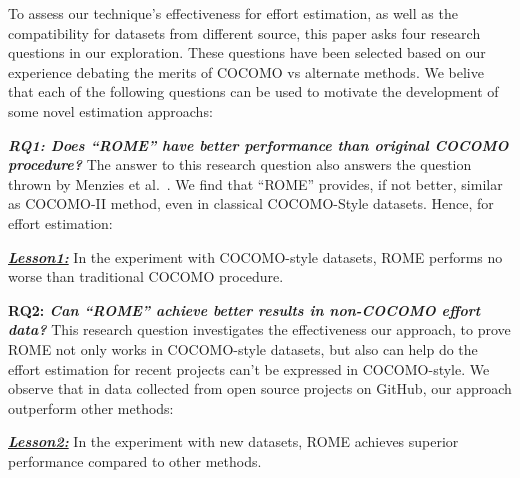 \documentclass[sigconf,review]{acmart}
\newenvironment{result}[2]
{\begin{myshadowbox}\textbf{\textit{\underline{Lesson#1:}}} #2}{ 
\end{myshadowbox}}
\begin{document}

To assess our technique's effectiveness for effort estimation, as well as the compatibility for datasets from different source, this paper asks four research questions in our exploration. These questions have been selected based on our experience debating the merits of COCOMO vs alternate methods. We belive that each of the following questions can be used to motivate the development of some  novel estimation approachs:


{\bf \em RQ1: Does ``ROME'' have better performance than original COCOMO procedure?} The answer to this research question also answers the question thrown by Menzies et al.~\cite{MenziesNeg:2017}. 
We find that ``ROME'' provides, if not better, similar as COCOMO-II method, even in classical COCOMO-Style datasets. Hence, for effort estimation:
 \begin{result}{1}
 In the experiment with COCOMO-style datasets, ROME performs no worse than traditional COCOMO procedure.
 \end{result}

{\bf RQ2: \em  Can ``ROME'' achieve better results in non-COCOMO effort data?}
 This research question investigates the effectiveness our approach, to prove ROME not only works in COCOMO-style datasets, but also can help  do the effort estimation for recent projects can't be expressed in COCOMO-style. We observe that in data collected from open source projects on GitHub, our approach outperform other methods:
 \begin{result}{2}
 In the experiment with new datasets, ROME achieves superior performance compared to other methods.
 \end{result}
 
\end{document}
